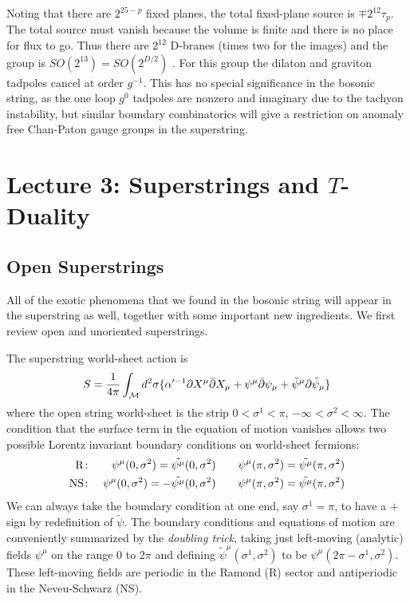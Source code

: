 \documentclass[12pt]{article}
\def\be{\begin{equation}}
\def\ee{\end{equation}}
\def\bea{\begin{eqnarray}}
\def\eea{\end{eqnarray}}
\begin{document}
Noting that there are $2^{25 - p}$ fixed planes, the total fixed-plane
source is $\mp 2^{12} \tau_p$.  The total source must vanish because the volume
is finite and there is no place for flux to go.  Thus there are $2^{12}$
D-branes (times two for the images) and the group is
$SO(2^{13}) = SO(2^{D/2})$ \cite{sobig}. For this group the dilaton and graviton tadpoles cancel at order
$g^{-1}$.  This has no special significance in the bosonic string, as the
one loop $g^0$ tadpoles are nonzero and imaginary due to the tachyon
instability, but similar boundary combinatorics
will give a restriction on anomaly free Chan-Paton gauge groups in the
superstring.

\section{Lecture 3: Superstrings and $T$-Duality}

\subsection{Open Superstrings}

All of the exotic phenomena that we found in the bosonic string will
appear in the superstring as well, together with some important new
ingredients.  We first review open and unoriented superstrings.

The superstring world-sheet action is 
\be
S = {{1}\over{4 \pi}} \int_{\cal M} d^2\sigma  
  \{ \alpha^{\prime-1} \partial X^{\mu} \bar{\partial} X_{\mu}
     + \psi^{\mu} \bar{\partial} \psi_{\mu} + 
       \tilde{\psi}^{\mu}\partial \tilde{\psi}_{\mu} \}
\ee
where the open string world-sheet is the strip 
$0 < \sigma^1 < \pi$, $- \infty <\sigma^2< \infty$.
The condition that the surface term in the equation of 
motion vanishes allows two possible Lorentz invariant boundary conditions
on world-sheet fermions:
\bea
{\rm R\colon} && \psi^{\mu}(0, \sigma^2) =\tilde{\psi^{\mu}}
(0,\sigma^2) 
 \qquad\psi^{\mu}(\pi ,\sigma^2 )= \tilde{\psi^{\mu}}(\pi,\sigma^2)
\nonumber\\ 
{\rm NS\colon} && \psi^{\mu}(0, \sigma^2) =-\tilde{\psi^{\mu}}
(0,\sigma^2) 
\qquad\psi^{\mu}(\pi ,\sigma^2 )= \tilde{\psi^{\mu}}(\pi,\sigma^2)
\eea
We can always take the boundary condition at one end, say $\sigma^1 =
\pi$, to have a $+$ sign by redefinition of $\tilde\psi$.  The boundary
conditions and equations of motion are conveniently summarized by the {\it
doubling trick}, taking just left-moving (analytic) fields $\psi^\mu$ on
the  range $0$ to $2\pi$ and defining $\tilde\psi^\mu(\sigma^1,\sigma^2)$
to be $\psi^\mu(2\pi - \sigma^1,\sigma^2)$.
These left-moving fields are periodic in the Ramond (R) sector and
antiperiodic in the Neveu-Schwarz (NS).
\end{document}
